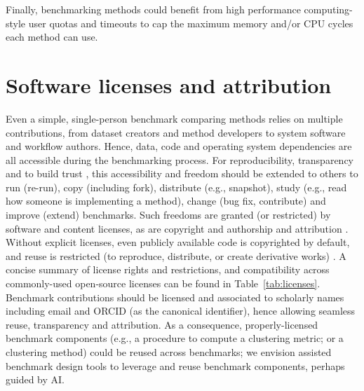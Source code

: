 \documentclass[11pt]{article}
\begin{document}
Finally, benchmarking methods could benefit from high performance computing-style user quotas and timeouts to cap the maximum memory and/or CPU cycles each method can use.

\section*{Software licenses and attribution}

Even a simple, single-person benchmark comparing methods relies on multiple contributions, from dataset creators and method developers to system software and workflow authors. Hence, data, code and operating system dependencies are all accessible during the benchmarking process. For reproducibility, transparency and to build trust \cite{Laine2007-py}, this accessibility and freedom should be extended to others to run (re-run), copy (including fork), distribute (e.g., snapshot), study (e.g., read how someone is implementing a method), change (bug fix, contribute) and improve (extend) benchmarks. Such freedoms are granted (or restricted) by software and content licenses, as are copyright and authorship and attribution \cite{Kreutzer2014-ua}. Without explicit licenses, even publicly available code is copyrighted by default, and reuse is restricted (to reproduce, distribute, or create derivative works) \cite{Kreutzer2014-ua}. A concise summary of license rights and restrictions, and compatibility across commonly-used open-source licenses can be found in Table~\ref{tab:licenses}. Benchmark contributions should be licensed and associated to scholarly names including email and ORCID (as the canonical identifier), hence allowing seamless reuse, transparency and attribution. As a consequence, properly-licensed benchmark components (e.g., a procedure to compute a clustering metric; or a clustering method) could be reused across benchmarks; we envision assisted benchmark design tools to leverage and reuse benchmark components, perhaps guided by AI.
\end{document}
